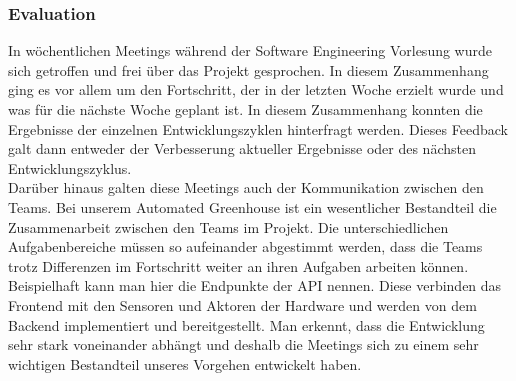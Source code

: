         \subsubsection*{Evaluation}
            In wöchentlichen Meetings während der Software Engineering Vorlesung wurde sich getroffen und frei über das 
            Projekt gesprochen. In diesem Zusammenhang ging es vor allem um den Fortschritt, der in der letzten 
            Woche erzielt wurde und was für die nächste Woche geplant ist. In diesem Zusammenhang konnten die 
            Ergebnisse der einzelnen Entwicklungszyklen hinterfragt werden. Dieses Feedback galt dann entweder der 
            Verbesserung aktueller Ergebnisse oder des nächsten Entwicklungszyklus. \\
            Darüber hinaus galten diese Meetings auch der Kommunikation zwischen den Teams. Bei unserem Automated 
            Greenhouse ist ein wesentlicher Bestandteil die Zusammenarbeit zwischen den Teams im Projekt. Die 
            unterschiedlichen Aufgabenbereiche müssen so aufeinander abgestimmt werden, dass die Teams trotz Differenzen 
            im Fortschritt weiter an ihren Aufgaben arbeiten können. Beispielhaft kann man hier die 
            Endpunkte der API nennen. Diese verbinden das Frontend mit den Sensoren und Aktoren der Hardware und 
            werden von dem Backend implementiert und bereitgestellt. Man erkennt, dass die Entwicklung sehr stark
            voneinander abhängt und deshalb die Meetings sich zu einem sehr wichtigen Bestandteil unseres Vorgehen
            entwickelt haben.

\pagebreak

